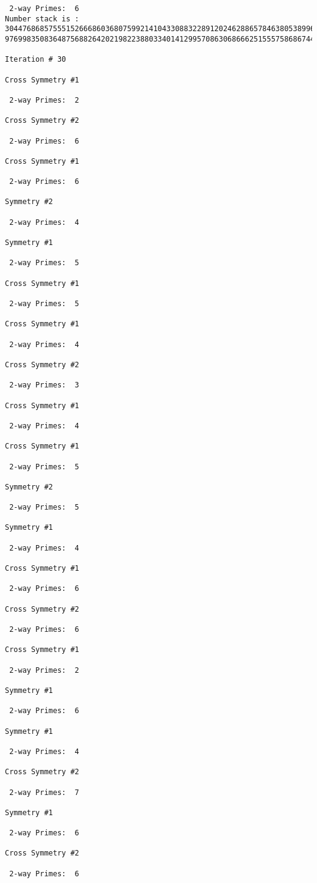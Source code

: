 \begin{verbatim}
 2-way Primes: 	6
Number stack is :
30447686857555152666860368075992141043308832289120246288657846380538996794608835958544046240163340857
97699835083648756882642021982238803340141299570863068666251555758686744037580433610426404458595388064

Iteration #	30

Cross Symmetry #1

 2-way Primes: 	2

Cross Symmetry #2

 2-way Primes: 	6

Cross Symmetry #1

 2-way Primes: 	6

Symmetry #2

 2-way Primes: 	4

Symmetry #1

 2-way Primes: 	5

Cross Symmetry #1

 2-way Primes: 	5

Cross Symmetry #1

 2-way Primes: 	4

Cross Symmetry #2

 2-way Primes: 	3

Cross Symmetry #1

 2-way Primes: 	4

Cross Symmetry #1

 2-way Primes: 	5

Symmetry #2

 2-way Primes: 	5

Symmetry #1

 2-way Primes: 	4

Cross Symmetry #1

 2-way Primes: 	6

Cross Symmetry #2

 2-way Primes: 	6

Cross Symmetry #1

 2-way Primes: 	2

Symmetry #1

 2-way Primes: 	6

Symmetry #1

 2-way Primes: 	4

Cross Symmetry #2

 2-way Primes: 	7

Symmetry #1

 2-way Primes: 	6

Cross Symmetry #2

 2-way Primes: 	6


\end{verbatim}

